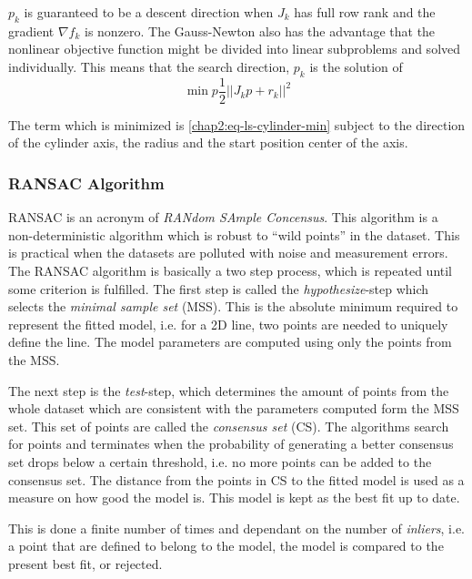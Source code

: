 $p_k$ is guaranteed to be a descent direction when $J_k$ has full row rank and the
gradient $\nabla f_k$ is nonzero. The Gauss-Newton also has the advantage that the
nonlinear objective function might be divided into linear subproblems and solved
individually. This means that the search direction, $p_k$ is the solution of
\begin{equation}
    \min{p} \frac{1}{2} || J_k p + r_k ||^2
\end{equation}

The term which is minimized is \eqref{chap2:eq-ls-cylinder-min} subject to the direction
of the cylinder axis, the radius and the start position center of the axis. 


\subsubsection{RANSAC Algorithm}
RANSAC is an acronym of \emph{RANdom SAmple Concensus}. This algorithm is a
non-deterministic algorithm which is robust to ``wild points'' in the dataset. This is
practical when the datasets are polluted with noise and measurement errors.
The RANSAC algorithm is basically a two step process, which is repeated until some
criterion is fulfilled. The first step is called the \emph{hypothesize}-step which selects
the \emph{minimal sample set} (MSS). This is the absolute minimum required to represent
the fitted model, i.e. for a 2D line, two points are needed to uniquely define the
line. The model parameters are computed using only the points from the MSS.

The next step is the \emph{test}-step, which determines the amount of points from the
whole dataset which are consistent with the parameters computed form the MSS set. This set
of points are called the \emph{consensus set} (CS). The algorithms search for points and
terminates when the probability of generating a better consensus set drops below a certain threshold, i.e.
no more points can be added to the consensus set. The distance from the points in CS to the 
fitted model is used as a measure on how good the model is. This model is kept as the best
fit up to date. \cite{ransac-dummies}

This is done a finite number of times and dependant on the number of \emph{inliers}, i.e.
a point that are defined to belong to the model, the model is compared to the present best
fit, or rejected.

